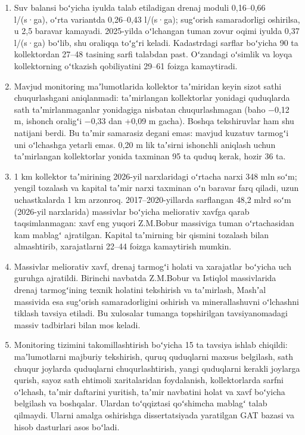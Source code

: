 \begin{enumerate}
\item
  Suv balansi boʻyicha iyulda talab etiladigan drenaj moduli 0,16--0,66
  l/(s·ga), oʻrta variantda 0,26--0,43 l/(s·ga); sugʻorish samaradorligi
  oshirilsa, u 2,5 baravar kamayadi. 2025-yilda oʻlchangan tuman zovur
  oqimi iyulda 0,37 l/(s·ga) boʻlib, shu oraliqqa toʻgʻri keladi.
  Kadastrdagi sarflar boʻyicha 90 ta kollektordan 27--48 tasining sarfi
  talabdan past. Oʻzandagi oʻsimlik va loyqa kollektorning oʻtkazish
  qobiliyatini 29--61 foizga kamaytiradi.
\item
  Mavjud monitoring maʼlumotlarida kollektor taʼmiridan keyin sizot
  sathi chuqurlashgani aniqlanmadi: taʼmirlangan kollektorlar yonidagi
  quduqlarda sath taʼmirlanmaganlar yonidagiga nisbatan chuqurlashmagan
  (baho −0,12 m, ishonch oraligʻi −0,33 dan +0,09 m gacha). Boshqa
  tekshiruvlar ham shu natijani berdi. Bu taʼmir samarasiz degani emas:
  mavjud kuzatuv tarmogʻi uni oʻlchashga yetarli emas. 0,20 m lik
  taʼsirni ishonchli aniqlash uchun taʼmirlangan kollektorlar yonida
  taxminan 95 ta quduq kerak, hozir 36 ta.
\item
  1 km kollektor taʼmirining 2026-yil narxlaridagi oʻrtacha narxi 348
  mln soʻm; yengil tozalash va kapital taʼmir narxi taxminan oʻn baravar
  farq qiladi, uzun uchastkalarda 1 km arzonroq. 2017--2020-yillarda
  sarflangan 48,2 mlrd soʻm (2026-yil narxlarida) massivlar boʻyicha
  meliorativ xavfga qarab taqsimlanmagan: xavf eng yuqori Z.M.Bobur
  massiviga tuman oʻrtachasidan kam mablagʻ ajratilgan. Kapital
  taʼmirning bir qismini tozalash bilan almashtirib, xarajatlarni 22--44
  foizga kamaytirish mumkin.
\item
  Massivlar meliorativ xavf, drenaj tarmogʻi holati va xarajatlar
  boʻyicha uch guruhga ajratildi. Birinchi navbatda Z.M.Bobur va
  Istiqlol massivlarida drenaj tarmogʻining texnik holatini tekshirish
  va taʼmirlash, Mashʼal massivida esa sugʻorish samaradorligini
  oshirish va minerallashuvni oʻlchashni tiklash tavsiya etiladi. Bu
  xulosalar tumanga topshirilgan tavsiyanomadagi massiv tadbirlari bilan
  mos keladi.
\item
  Monitoring tizimini takomillashtirish boʻyicha 15 ta tavsiya ishlab
  chiqildi: maʼlumotlarni majburiy tekshirish, quruq quduqlarni maxsus
  belgilash, sath chuqur joylarda quduqlarni chuqurlashtirish, yangi
  quduqlarni kerakli joylarga qurish, sayoz sath ehtimoli xaritalaridan
  foydalanish, kollektorlarda sarfni oʻlchash, taʼmir daftarini
  yuritish, taʼmir navbatini holat va xavf boʻyicha belgilash va
  boshqalar. Ulardan toʻqqiztasi qoʻshimcha mablagʻ talab qilmaydi.
  Ularni amalga oshirishga dissertatsiyada yaratilgan GAT bazasi va
  hisob dasturlari asos boʻladi.
\end{enumerate}

